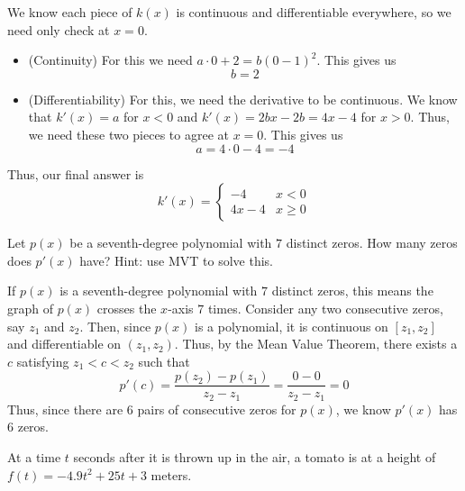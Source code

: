 \documentclass[11pt]{exam}
\begin{document}
\begin{questions}
\begin{solution}
  We know each piece of \(k(x)\) is continuous and differentiable
  everywhere, so we need only check at \(x=0\). 
  \begin{itemize}
  \item (Continuity) For this we need \(a \cdot 0 + 2 =
    b(0-1)^2\). This gives us \[
      b=2
    \]
  \item (Differentiability) For this, we need the derivative to be
    continuous. We know that \(k'(x) = a\) for \(x<0\) and \(k'(x) =
    2bx-2b = 4x-4\) for \(x > 0\). Thus, we need these two pieces to
    agree at \(x=0\). This gives us \[
      a = 4 \cdot 0 - 4 = -4
    \]
  \end{itemize}
  Thus, our final answer is \[
    k'(x) =
    \begin{cases}
      -4 & x < 0 \\
      4x-4 & x \geq 0
    \end{cases}
  \]
\end{solution}
\question Let \(p(x)\) be a seventh-degree polynomial with \(7\)
  distinct zeros. How many zeros does \(p'(x)\) have? Hint: use MVT
  to solve this.
  \begin{solution}
    If \(p(x)\) is a seventh-degree polynomial with \(7\) distinct
    zeros, this means the graph of \(p(x)\) crosses the \(x\)-axis
    \(7\) times. Consider any two consecutive zeros, say \(z_1\) and
    \(z_2\). Then, since \(p(x)\) is a polynomial, it is continuous on
    \([z_1,z_2]\) and differentiable on \((z_1,z_2)\). Thus, by the
    Mean Value Theorem, there exists a \(c\) satisfying \(z_1 < c <
    z_2\) such that \[
      p'(c) = \frac{p(z_2)-p(z_1)}{z_2-z_1} = \frac{0-0}{z_2-z_1} = 0
    \]
    Thus, since there are \(6\) pairs of consecutive zeros for
    \(p(x)\), we know \(p'(x)\) has \(6\) zeros.
  \end{solution}
\question At a time $t$ seconds after it is thrown up in the air, a tomato is at a height of $f(t)=-4.9 t^2 + 25 t + 3$ meters. 
\begin{enumerate}[(a)]

\end{enumerate}
\end{questions}
\end{document}
